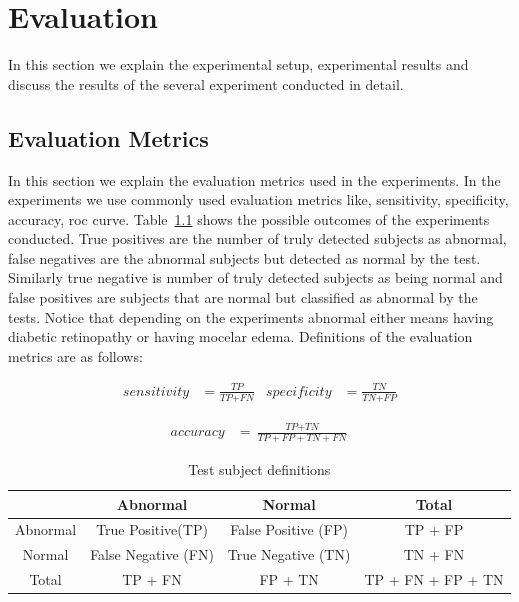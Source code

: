 \chapter{Evaluation}

In this section we explain the experimental setup, experimental results and discuss the results of the several experiment conducted in detail. 

\section{Evaluation Metrics}
In this section we explain the evaluation metrics used in the experiments. In the experiments we use commonly used evaluation metrics like, sensitivity, specificity, accuracy, roc curve. Table~\ref{tab:configs} shows the possible outcomes of the experiments conducted. True positives are the number of truly detected subjects as abnormal, false negatives are the abnormal subjects but detected as normal by the test. Similarly true negative is number of truly detected subjects as being normal and false positives are subjects that are normal but classified as abnormal by the tests. Notice that depending on the experiments abnormal either means having diabetic retinopathy or having mocelar edema. Definitions of the evaluation metrics are as follows: 

\begin{align*}
    \textit{sensitivity} &= \frac{\textit{TP}}{\textit{TP} + \textit{FN}}
    &
    \textit{specificity} &= \frac{\textit{TN}}{\textit{TN} + \textit{FP}}
\end{align*}

\begin{align*}
    \textit{accuracy} &= \frac{\textit{TP} + \textit{TN}}{\textit{TP} + \textit{FP} + \textit{TN} + \textit{FN}}
\end{align*}

\begin{table}[t]
\centering
\caption{Test subject definitions} 
\label{tab:configs}
\begin{tabular}{|c|c|c|c|} \hline
     & Abnormal & Normal & Total  \\ \hline
     Abnormal& True Positive(TP) & False Positive (FP) & TP + FP \\ \hline
     Normal & False Negative (FN) & True Negative (TN) & TN + FN \\ \hline
     Total & TP + FN &  FP + TN & TP + FN + FP + TN \\ \hline
\end{tabular}
\end{table}

